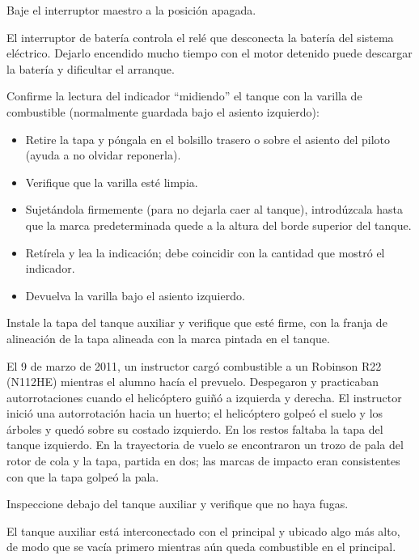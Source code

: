 Baje el interruptor maestro a la posición apagada.

\begin{nota}
El interruptor de batería controla el relé que desconecta la batería del sistema eléctrico. Dejarlo encendido mucho tiempo con el motor detenido puede descargar la batería y dificultar el arranque.
\end{nota}

Confirme la lectura del indicador ``midiendo'' el tanque con la varilla de combustible (normalmente guardada bajo el asiento izquierdo):
\begin{itemize}
\item Retire la tapa y póngala en el bolsillo trasero o sobre el asiento del piloto (ayuda a no olvidar reponerla).
\item Verifique que la varilla esté limpia.
\item Sujetándola firmemente (para no dejarla caer al tanque), introdúzcala hasta que la marca predeterminada quede a la altura del borde superior del tanque.
\item Retírela y lea la indicación; debe coincidir con la cantidad que mostró el indicador.
\item Devuelva la varilla bajo el asiento izquierdo.
\end{itemize}

Instale la tapa del tanque auxiliar y verifique que esté firme, con la franja de alineación de la tapa alineada con la marca pintada en el tanque.

\begin{caso}
El 9 de marzo de 2011, un instructor cargó combustible a un Robinson R22 (N112HE) mientras el alumno hacía el prevuelo. Despegaron y practicaban autorrotaciones cuando el helicóptero guiñó a izquierda y derecha. El instructor inició una autorrotación hacia un huerto; el helicóptero golpeó el suelo y los árboles y quedó sobre su costado izquierdo. En los restos faltaba la tapa del tanque izquierdo. En la trayectoria de vuelo se encontraron un trozo de pala del rotor de cola y la tapa, partida en dos; las marcas de impacto eran consistentes con que la tapa golpeó la pala.
\end{caso}

Inspeccione debajo del tanque auxiliar y verifique que no haya fugas.

\begin{nota}
El tanque auxiliar está interconectado con el principal y ubicado algo más alto, de modo que se vacía primero mientras aún queda combustible en el principal.
\end{nota}

